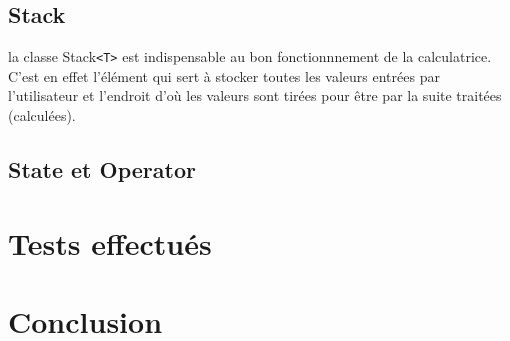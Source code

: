 \documentclass[12pt]{report}
\begin{document}
    \subsection*{Stack}
        la classe Stack\verb|<T>| est indispensable au bon fonctionnnement de la calculatrice. C'est en effet l'élément qui
    sert à stocker toutes les valeurs entrées par l'utilisateur et l'endroit d'où les valeurs sont tirées pour être par la suite traitées (calculées).


    \subsection*{State et Operator}





    \section*{Tests effectués}

    \section*{Conclusion}
\end{document}
